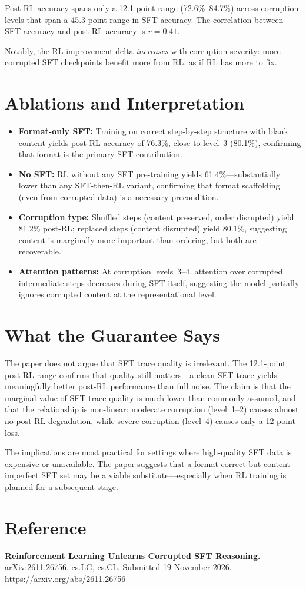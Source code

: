 \documentclass[10pt,twocolumn]{article}
\begin{document}
Post-RL accuracy spans only a 12.1-point range (72.6\%--84.7\%) across corruption levels that span a 45.3-point range in SFT accuracy.
The correlation between SFT accuracy and post-RL accuracy is $r = 0.41$.

Notably, the RL improvement delta \emph{increases} with corruption severity: more corrupted SFT checkpoints benefit more from RL, as if RL has more to fix.

\section{Ablations and Interpretation}

\begin{itemize}[leftmargin=1em,itemsep=2pt]
  \item \textbf{Format-only SFT:} Training on correct step-by-step structure with blank content yields post-RL accuracy of 76.3\%, close to level~3 (80.1\%), confirming that format is the primary SFT contribution.
  \item \textbf{No SFT:} RL without any SFT pre-training yields 61.4\%---substantially lower than any SFT-then-RL variant, confirming that format scaffolding (even from corrupted data) is a necessary precondition.
  \item \textbf{Corruption type:} Shuffled steps (content preserved, order disrupted) yield 81.2\% post-RL; replaced steps (content disrupted) yield 80.1\%, suggesting content is marginally more important than ordering, but both are recoverable.
  \item \textbf{Attention patterns:} At corruption levels~3--4, attention over corrupted intermediate steps decreases during SFT itself, suggesting the model partially ignores corrupted content at the representational level.
\end{itemize}

\section{What the Guarantee Says}

The paper does not argue that SFT trace quality is irrelevant.
The 12.1-point post-RL range confirms that quality still matters---a clean SFT trace yields meaningfully better post-RL performance than full noise.
The claim is that the marginal value of SFT trace quality is much lower than commonly assumed, and that the relationship is non-linear: moderate corruption (level~1--2) causes almost no post-RL degradation, while severe corruption (level~4) causes only a 12-point loss.

The implications are most practical for settings where high-quality SFT data is expensive or unavailable.
The paper suggests that a format-correct but content-imperfect SFT set may be a viable substitute---especially when RL training is planned for a subsequent stage.

\section*{Reference}
\textbf{Reinforcement Learning Unlearns Corrupted SFT Reasoning.}
arXiv:2611.26756. cs.LG, cs.CL. Submitted 19 November 2026.
\url{https://arxiv.org/abs/2611.26756}
\end{document}
